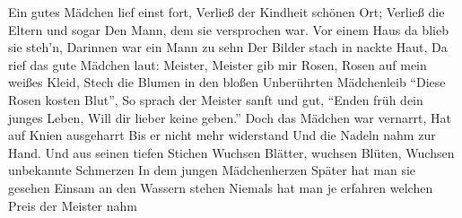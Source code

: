 
\beginverse
Ein gutes Mädchen lief einst fort,
Verließ der Kindheit schönen Ort;
Verließ die Eltern und sogar
Den Mann, dem sie versprochen war.
Vor einem Haus da blieb sie steh'n,
Darinnen war ein Mann zu sehn
Der Bilder stach in nackte Haut,
Da rief das gute Mädchen laut:
\endverse
\beginchorus
Meister, Meister gib mir Rosen,
Rosen auf mein weißes Kleid,
Stech die Blumen in den bloßen
Unberührten Mädchenleib
\endchorus
\beginverse
``Diese Rosen kosten Blut'',
So sprach der Meister sanft und gut,
``Enden früh dein junges Leben,
Will dir lieber keine geben.''
Doch das Mädchen war vernarrt,
Hat auf Knien ausgeharrt
Bis er nicht mehr widerstand
Und die Nadeln nahm zur Hand.
\endverse
{}
\beginverse*
Und aus seinen tiefen Stichen
Wuchsen Blätter, wuchsen Blüten,
Wuchsen unbekannte Schmerzen
In dem jungen Mädchenherzen
Später hat man sie gesehen
Einsam an den Wassern stehen
Niemals hat man je erfahren
welchen Preis der Meister nahm
\endverse
{}
\endsong
